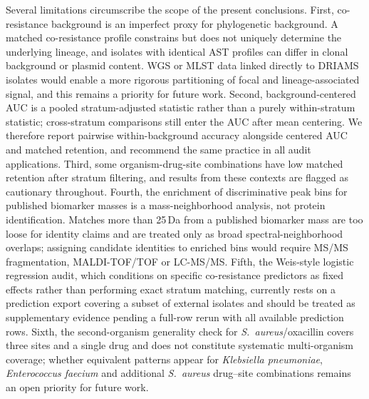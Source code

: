 \documentclass[11pt]{article}
\begin{document}
Several limitations circumscribe the scope of the present conclusions. First, co-resistance background is an imperfect proxy for phylogenetic background. A matched co-resistance profile constrains but does not uniquely determine the underlying lineage, and isolates with identical AST profiles can differ in clonal background or plasmid content. WGS or MLST data linked directly to DRIAMS isolates would enable a more rigorous partitioning of focal and lineage-associated signal, and this remains a priority for future work. Second, background-centered AUC is a pooled stratum-adjusted statistic rather than a purely within-stratum statistic; cross-stratum comparisons still enter the AUC after mean centering. We therefore report pairwise within-background accuracy alongside centered AUC and matched retention, and recommend the same practice in all audit applications. Third, some organism-drug-site combinations have low matched retention after stratum filtering, and results from these contexts are flagged as cautionary throughout. Fourth, the enrichment of discriminative peak bins for published biomarker masses is a mass-neighborhood analysis, not protein identification. Matches more than 25\,Da from a published biomarker mass are too loose for identity claims and are treated only as broad spectral-neighborhood overlaps; assigning candidate identities to enriched bins would require MS/MS fragmentation, MALDI-TOF/TOF or LC-MS/MS. Fifth, the Weis-style logistic regression audit, which conditions on specific co-resistance predictors as fixed effects rather than performing exact stratum matching, currently rests on a prediction export covering a subset of external isolates and should be treated as supplementary evidence pending a full-row rerun with all available prediction rows. Sixth, the second-organism generality check for \textit{S.~aureus}/oxacillin covers three sites and a single drug and does not constitute systematic multi-organism coverage; whether equivalent patterns appear for \textit{Klebsiella pneumoniae}, \textit{Enterococcus faecium} and additional \textit{S.~aureus} drug--site combinations remains an open priority for future work.
\end{document}
